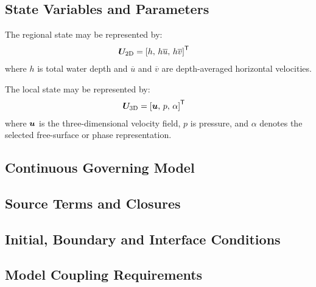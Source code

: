 \subsection{State Variables and Parameters}
\label{sec:res-mod-mul-state-variables-parameters}


The regional state may be represented by:
\begin{align}
  \boldsymbol{U}_{\mathrm{2D}} &= \left[ h,\, h\overline{u},\, h\overline{v} \right]^{\mathsf{T}}
  \label{eq:res-mod-mul-two-dimensional-state}
\end{align}
where $h$ is total water depth and $\overline{u}$ and $\overline{v}$ are depth-averaged horizontal velocities.

The local state may be represented by:
\begin{align}
  \boldsymbol{U}_{\mathrm{3D}} &= \left[ \boldsymbol{u},\, p,\, \alpha \right]^{\mathsf{T}}
  \label{eq:res-mod-mul-three-dimensional-state}
\end{align}
where $\boldsymbol{u}$ is the three-dimensional velocity field, $p$ is pressure, and $\alpha$ denotes the selected free-surface or phase representation.

\subsection{Continuous Governing Model}
\label{sec:res-mod-mul-continuous-governing-model}


\subsection{Source Terms and Closures}
\label{sec:res-mod-mul-source-terms-closures}


\subsection{Initial, Boundary and Interface Conditions}
\label{sec:res-mod-mul-initial-boundary-interface-conditions}


\subsection{Model Coupling Requirements}
\label{sec:res-mod-mul-model-coupling-requirements}

